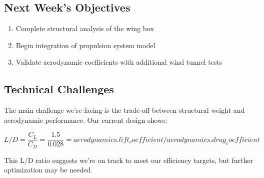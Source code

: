 \documentclass[12pt]{article}
\begin{document}
\subsection{Next Week's Objectives}\label{next-weeks-objectives}

\begin{enumerate}
\def\labelenumi{\arabic{enumi}.}
\tightlist
\item
  Complete structural analysis of the wing box
\item
  Begin integration of propulsion system model
\item
  Validate aerodynamic coefficients with additional wind tunnel tests
\end{enumerate}

\subsection{Technical Challenges}\label{technical-challenges}

The main challenge we're facing is the trade-off between structural
weight and aerodynamic performance. Our current design shows:

\[ L/D = \frac{C_L}{C_D} = \frac{1.5}{0.028} = {{ aerodynamics.lift_coefficient / aerodynamics.drag_coefficient }} \]

This L/D ratio suggests we're on track to meet our efficiency targets,
but further optimization may be needed.
\end{document}
